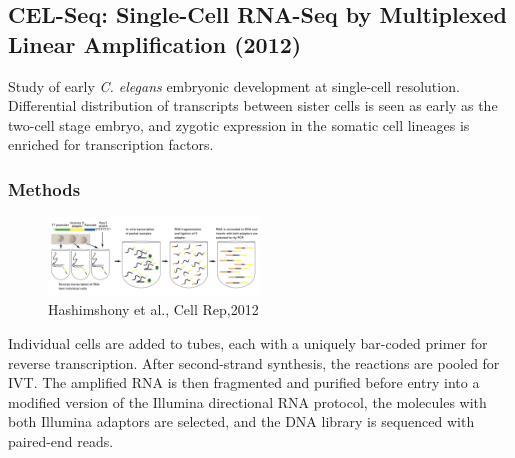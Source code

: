 \hypertarget{cel-seq-single-cell-rna-seq-by-multiplexed-linear-amplification-2012}{%
\subsection{CEL-Seq: Single-Cell RNA-Seq by Multiplexed Linear
Amplification
(2012)}\label{cel-seq-single-cell-rna-seq-by-multiplexed-linear-amplification-2012}}

Study of early \emph{C. elegans} embryonic development at single-cell
resolution. Differential distribution of transcripts between sister
cells is seen as early as the two-cell stage embryo, and zygotic
expression in the somatic cell lineages is enriched for transcription
factors.

\hypertarget{methods-1}{%
\subsubsection{Methods}\label{methods-1}}

\begin{figure}
\centering
\includegraphics[width=0.5\textwidth]{images/Screen_Shot_2023-02-21_at_13-19-47.png}
\caption{Hashimshony  et al., Cell Rep,2012}
\end{figure}

Individual cells are added to tubes, each with a uniquely bar-coded
primer for reverse transcription. After second-strand synthesis, the
reactions are pooled for IVT. The amplified RNA is then fragmented and
purified before entry into a modified version of the Illumina
directional RNA protocol, the molecules with both Illumina adaptors are
selected, and the DNA library is sequenced with paired-end reads.

